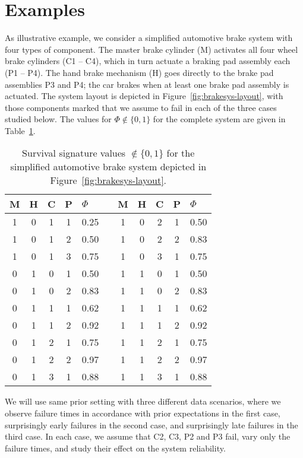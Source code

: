 \documentclass[Journal,SectionNumbers,SingleSpace,InsideFigs]{ascelike}
\begin{document}
\section{Examples}
\label{sec:examples}

As illustrative example, we consider a simplified automotive brake system with four types of component.
The master brake cylinder (M) activates all four wheel brake cylinders (C1 -- C4),
which in turn actuate a braking pad assembly each (P1 -- P4).
The hand brake mechanism (H) goes directly to the brake pad assemblies P3 and P4;
the car brakes when at least one brake pad assembly is actuated.
The system layout is depicted in Figure~\ref{fig:brakesys-layout},
with those components marked that we assume to fail in each of the three cases studied below.
The values for $\Phi \not\in \{0,1\}$ for the complete system are given in Table~\ref{tab:brake-survsign}.

\begin{table}
\centering
\begin{tabular}{cccclcccccl}
  \toprule
M & H & C & P & $\Phi$ & \quad & M & H & C & P & $\Phi$\\ 
  \midrule
1 & 0 & 1 & 1 & 0.25 & & 1 & 0 & 2 & 1 & 0.50 \\ 
1 & 0 & 1 & 2 & 0.50 & & 1 & 0 & 2 & 2 & 0.83 \\ 
1 & 0 & 1 & 3 & 0.75 & & 1 & 0 & 3 & 1 & 0.75 \\ 
0 & 1 & 0 & 1 & 0.50 & & 1 & 1 & 0 & 1 & 0.50 \\ 
0 & 1 & 0 & 2 & 0.83 & & 1 & 1 & 0 & 2 & 0.83 \\ 
0 & 1 & 1 & 1 & 0.62 & & 1 & 1 & 1 & 1 & 0.62 \\ 
0 & 1 & 1 & 2 & 0.92 & & 1 & 1 & 1 & 2 & 0.92 \\ 
0 & 1 & 2 & 1 & 0.75 & & 1 & 1 & 2 & 1 & 0.75 \\ 
0 & 1 & 2 & 2 & 0.97 & & 1 & 1 & 2 & 2 & 0.97 \\ 
0 & 1 & 3 & 1 & 0.88 & & 1 & 1 & 3 & 1 & 0.88 \\ 
   \bottomrule
\end{tabular}
\caption{Survival signature values $\not\in \{0,1\}$ for the simplified automotive brake system depicted in Figure~\ref{fig:brakesys-layout}.}
\label{tab:brake-survsign}
\end{table}

We will use same prior setting with three different data scenarios,
where we observe failure times in accordance with prior expectations in the first case,
surprisingly early failures in the second case, and
surprisingly late failures in the third case.
In each case, we assume that C2, C3, P2 and P3 fail, vary only the failure times,
and study their effect on the system reliability.
\end{document}
